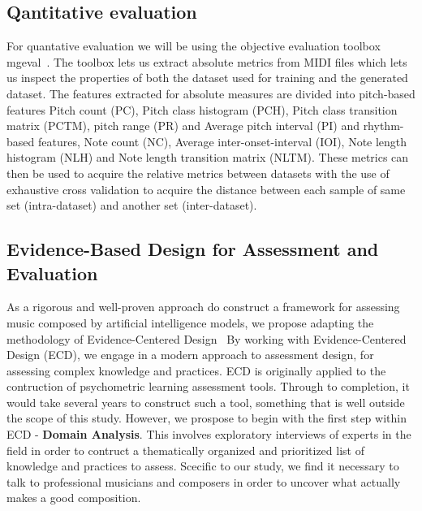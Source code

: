 \documentclass{IEEEtran}
\begin{document}
    
    \subsection{Qantitative evaluation}
        For quantative evaluation we will be using the objective
        evaluation toolbox mgeval~\cite{yang2020evaluation}.
        The toolbox lets us extract absolute metrics from MIDI files
        which lets us inspect the properties of both the dataset used
        for training and the generated dataset. The features extracted
        for absolute measures are divided into pitch-based features Pitch count (PC),
        Pitch class histogram (PCH), Pitch class transition matrix (PCTM),
        pitch range (PR) and Average pitch interval (PI) and rhythm-based features,
        Note count (NC), Average inter-onset-interval (IOI), Note length
        histogram (NLH) and Note length transition matrix (NLTM).
        These metrics can then be used to acquire the relative metrics between
        datasets with the use of exhaustive cross validation to acquire the
        distance between each sample of same set (intra-dataset) and another
        set (inter-dataset). 

    \subsection{Evidence-Based Design for Assessment and Evaluation}
        As a rigorous and well-proven approach do construct a framework for 
        assessing music composed by artificial intelligence models, we propose 
        adapting the methodology of Evidence-Centered
        Design~\cite{mislevy2003focus,mislevy2017evidence}
        By working with Evidence-Centered Design (ECD), we engage in a modern
        approach to assessment design,
        for assessing complex knowledge and practices.
        ECD is originally applied to the contruction of psychometric learning
        assessment tools. Through to completion, it would take several years to 
        construct such a tool, something that is well outside the scope of this 
        study. However, we prospose to begin with the first step within ECD - 
        \textbf{Domain Analysis}. This involves exploratory interviews of experts
        in the field in order to contruct a thematically organized and prioritized
        list of knowledge and practices to assess. Scecific to our study,
        we find it necessary to talk to professional musicians and composers 
        in order to uncover what actually makes a good composition.
\end{document}
